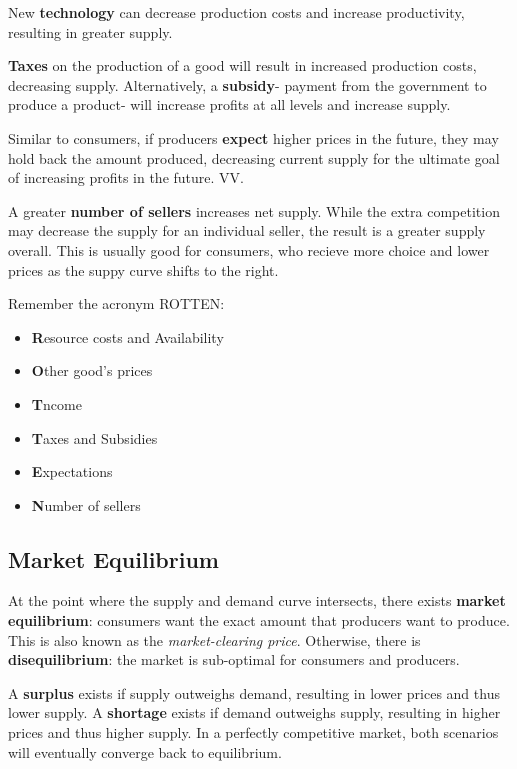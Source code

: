 \documentclass[12pt, a4paper]{article}
\theoremstyle{definition}
\begin{document}
New \textbf{technology} can decrease production costs and increase productivity, resulting in greater supply.

\textbf{Taxes} on the production of a good will result in increased production costs, decreasing supply.
Alternatively, a \textbf{subsidy}- payment from the government to produce a product- will increase profits at all levels and increase supply.

Similar to consumers, if producers \textbf{expect} higher prices in the future, they may hold back the amount produced, decreasing current supply for the ultimate goal of increasing profits in the future.
VV.

A greater \textbf{number of sellers} increases net supply.
While the extra competition may decrease the supply for an individual seller, the result is a greater supply overall.
This is usually good for consumers, who recieve more choice and lower prices as the suppy curve shifts to the right.

Remember the acronym ROTTEN:
\begin{itemize}
    \item \textbf{R}esource costs and Availability
    \item \textbf{O}ther good's prices
    \item \textbf{T}ncome
    \item \textbf{T}axes and Subsidies
    \item \textbf{E}xpectations
    \item \textbf{N}umber of sellers
\end{itemize}

\subsection{Market Equilibrium}

At the point where the supply and demand curve intersects, there exists \textbf{market equilibrium}: consumers want the exact amount that producers want to produce.
This is also known as the \textit{market-clearing price}.
Otherwise, there is \textbf{disequilibrium}: the market is sub-optimal for consumers and producers.

A \textbf{surplus} exists if supply outweighs demand, resulting in lower prices and thus lower supply.
A \textbf{shortage} exists if demand outweighs supply, resulting in higher prices and thus higher supply.
In a perfectly competitive market, both scenarios will eventually converge back to equilibrium.
\end{document}
